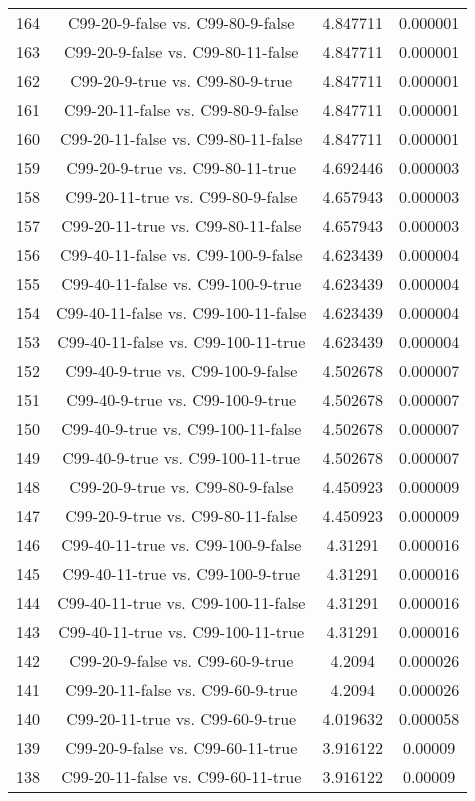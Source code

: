 \documentclass[a4paper,10pt]{article}
\begin{document}
\begin{landscape}
\begin{table}[!htp]
\begin{tabular}{cccc}
164&C99-20-9-false vs. C99-80-9-false&4.847711&0.000001\\
163&C99-20-9-false vs. C99-80-11-false&4.847711&0.000001\\
162&C99-20-9-true vs. C99-80-9-true&4.847711&0.000001\\
161&C99-20-11-false vs. C99-80-9-false&4.847711&0.000001\\
160&C99-20-11-false vs. C99-80-11-false&4.847711&0.000001\\
159&C99-20-9-true vs. C99-80-11-true&4.692446&0.000003\\
158&C99-20-11-true vs. C99-80-9-false&4.657943&0.000003\\
157&C99-20-11-true vs. C99-80-11-false&4.657943&0.000003\\
156&C99-40-11-false vs. C99-100-9-false&4.623439&0.000004\\
155&C99-40-11-false vs. C99-100-9-true&4.623439&0.000004\\
154&C99-40-11-false vs. C99-100-11-false&4.623439&0.000004\\
153&C99-40-11-false vs. C99-100-11-true&4.623439&0.000004\\
152&C99-40-9-true vs. C99-100-9-false&4.502678&0.000007\\
151&C99-40-9-true vs. C99-100-9-true&4.502678&0.000007\\
150&C99-40-9-true vs. C99-100-11-false&4.502678&0.000007\\
149&C99-40-9-true vs. C99-100-11-true&4.502678&0.000007\\
148&C99-20-9-true vs. C99-80-9-false&4.450923&0.000009\\
147&C99-20-9-true vs. C99-80-11-false&4.450923&0.000009\\
146&C99-40-11-true vs. C99-100-9-false&4.31291&0.000016\\
145&C99-40-11-true vs. C99-100-9-true&4.31291&0.000016\\
144&C99-40-11-true vs. C99-100-11-false&4.31291&0.000016\\
143&C99-40-11-true vs. C99-100-11-true&4.31291&0.000016\\
142&C99-20-9-false vs. C99-60-9-true&4.2094&0.000026\\
141&C99-20-11-false vs. C99-60-9-true&4.2094&0.000026\\
140&C99-20-11-true vs. C99-60-9-true&4.019632&0.000058\\
139&C99-20-9-false vs. C99-60-11-true&3.916122&0.00009\\
138&C99-20-11-false vs. C99-60-11-true&3.916122&0.00009\\

\end{tabular}
\end{table}
\end{landscape}
\end{document}
